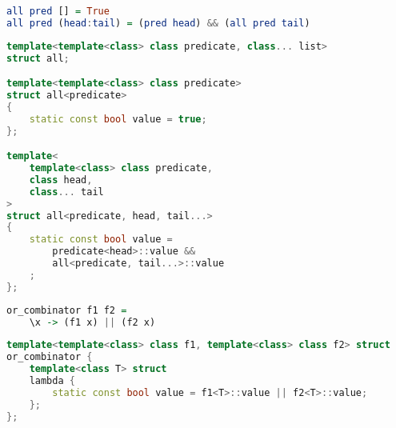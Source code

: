 \documentclass{article}
\begin{document}
\begin{center}
\begin{comment}
Higher-Order Functions Operating on Lists
Once you combine higher-order functions with lists you have a powerful functional language at your disposal. Higher-order functions operating on lists look very much like algorithms. Let me show you some classic examples. Here’s the function (or algorithm), all, that returns true if and only if all elements of a list satisfy a given predicate.
\end{comment}
\begin{lstlisting}[language=Haskell]
all pred [] = True
all pred (head:tail) = (pred head) && (all pred tail)
\end{lstlisting}
\Bigg\Downarrow
\begin{lstlisting}[language=C++]
template<template<class> class predicate, class... list>
struct all;

template<template<class> class predicate>
struct all<predicate> 
{
    static const bool value = true;
};

template<
    template<class> class predicate, 
    class head, 
    class... tail
> 
struct all<predicate, head, tail...> 
{
    static const bool value = 
        predicate<head>::value && 
        all<predicate, tail...>::value
    ;
};
\end{lstlisting}
\end{center}

\begin{center}
\begin{comment}
Let’s start with a Haskell example. I want to define a function that takes two predicate functions and returns another predicate function that combines the two using logical OR. Here it is in Haskell: <lenti Haskell kód>. The or_combinator returns an anonymous function (the famous “lambda”) that takes one argument, x, calls both f1 and f2 with it, and returns the logical OR of the two results. The return value of or_combinator is this freshly constructed function. I can then call this function with an arbitrary argument. For instance, here I’m checking if 2 is either zero or one (guess what, it isn’t!):
(or_combinator is_zero is_one) 2
\end{comment}
\begin{lstlisting}[language=Haskell]
or_combinator f1 f2 = 
    \x -> (f1 x) || (f2 x)
\end{lstlisting}
\Bigg\Downarrow
\begin{lstlisting}[language=C++]
template<template<class> class f1, template<class> class f2> struct
or_combinator {
    template<class T> struct
    lambda {
        static const bool value = f1<T>::value || f2<T>::value;
    };
};
\end{lstlisting}
\end{center}
\end{document}
